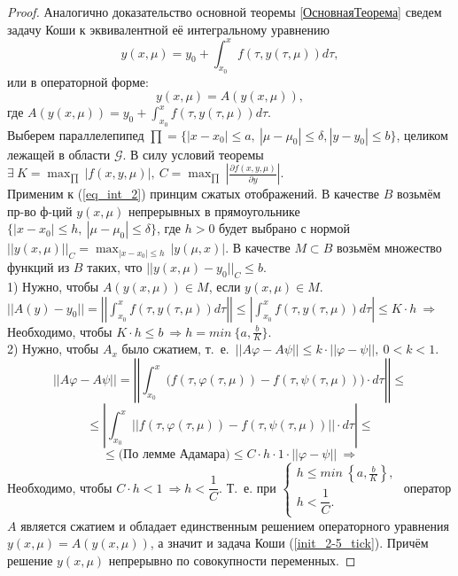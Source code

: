 \begin{proof}
	Аналогично доказательство основной теоремы \ref{ОсновнаяТеорема} сведем задачу Коши к эквивалентной её интегральному уравнению 
	\begin{equation}\label{eq_int_1}
		y(x, \mu) = y_0 + \int_{x_0}^{x} f(\tau, y(\tau, \mu)) d\tau,
	\end{equation}
	или в операторной форме:
	\begin{equation}\label{eq_int_2}
		y(x, \mu) = A(y(x, \mu)),
	\end{equation}
	где $\displaystyle A(y(x, \mu)) = y_0 + \int_{x_0}^{x} f(\tau, y(\tau, \mu)) d\tau$.\\
	Выберем параллелепипед $\prod = \{ |x - x_0| \leq a,\ |\mu - \mu_0| \leq \delta, |y - y_0| \leq b\}$, целиком лежащей в области $\mathcal{G}$. В силу условий теоремы $\displaystyle \exists\ K = \max_{\prod \ }|f(x, y, \mu)|,\ C = \max_{\prod \ } \left| \frac{\partial f(x, y, \mu)}{\partial y} \right|$.\\ 
	Применим к (\ref{eq_int_2}) принцим сжатых отображений. В качестве $B$ возьмём пр-во ф-ций $y(x, \mu)$ непрерывных в прямоугольнике $\{|x - x_0| \leq h,\ |\mu - \mu_0| \leq \delta\}$, где $h > 0$ будет выбрано с нормой $\displaystyle||y(x, \mu)||_C = \max_{|x - x_0| \leq h\ } |y (\mu, x)|$. В качестве $M \subset B$ возьмём множество функций из $B$ таких, что $||y(x, \mu) - y_0||_C \leq b$.\\
	1) Нужно, чтобы $A(y(x, \mu)) \in M$, если $y(x, \mu) \in M$. $||A(y) - y_0|| = \left|\left|\displaystyle \int_{x_0}^{x} f(\tau, y(\tau, \mu)) d\tau \right|\right| \leq \displaystyle \left|\int_{x_0}^{x} f(\tau, y(\tau, \mu)) d\tau\right| \leq K \cdot h\ \Rightarrow$ Необходимо, чтобы $K\cdot h \leq b\ \Rightarrow h = min\ \{a, \frac{b}{K}\}$. \\
	2) Нужно, чтобы $A_x$ было сжатием, т.\ е.\ $||A\varphi - A\psi|| \leq k \cdot ||\varphi - \psi||,\ 0 < k < 1$. \\
	$$||A\varphi - A\psi|| = \left|\left|\displaystyle\int_{x_0}^{x} \Big( f(\tau, \varphi(\tau, \mu)) - f(\tau, \psi(\tau, \mu)) \Big) \cdot d\tau \right|\right| \leq $$
	$$ \leq \left|\displaystyle \int_{x_0}^{x} ||f(\tau, \varphi(\tau, \mu)) - f(\tau, \psi(\tau, \mu))|| \cdot d\tau \right| \leq $$ 
	$$ \leq \text{(По лемме Адамара)} \leq C\cdot h\cdot 1\cdot ||\varphi - \psi||\ \Rightarrow$$
	Необходимо, чтобы $C\cdot h < 1\ \Rightarrow h < \dfrac{1}{C}$.
	Т.\ е. при 
	$\begin{cases} 
		h \leq min ~ \left \{a, \frac{b}{K} \right \}, \\
		h < \dfrac{1}{C}. 
	\end{cases}$
	оператор $A$ является сжатием и обладает единственным решением операторного уравнения $y(x, \mu) = A(y(x, \mu))$, а значит и задача Коши (\ref{init_2-5_tick}). Причём решение $y(x, \mu)$ непрерывно по совокупности переменных.
\end{proof}
